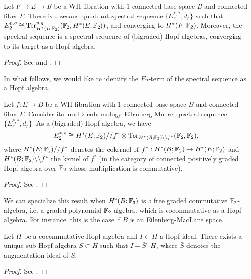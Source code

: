 \begin{thm}
Let $F\to E\to B$ be a WH-fibration with $1$-connected base space $B$ and connected fiber $F$. There is a second quadrant spectral sequence $\{E_r^{*,*},d_r\}$ such that $E_2^{p,q}\cong\operatorname{Tor}_{H^*(B;\mathbb{F}_2)}^{p,q}(\mathbb{F}_2,H^*(E;\mathbb{F}_2))$, and converging to $H^*(F;\mathbb{F}_2)$. Moreover, the spectral sequence is a spectral sequence of (bigraded) Hopf algebras, converging to its target as a Hopf algebra.
\end{thm}

\begin{proof}
See \cite[Theorem 1.1, pp. 59-61]{Sm70} and \cite[Appendix: Generalizations, pp. 779-780]{MS68-I}.
\end{proof}

In what follows, we would like to identify the $E_2$-term of the spectral sequence as a Hopf algebra.

\begin{thm}
Let $f:E\to B$ be a WH-fibration with $1$-connected base space $B$ and connected fiber $F$. Consider its mod-$2$ cohomology Eilenberg-Moore spectral sequence $\{E_r^{*,*},d_r\}$. As a (bigraded) Hopf algebra, we have
$$
E_2^{*,*}\cong H^*(E;\mathbb{F}_2)//f^*\otimes\operatorname{Tor}_{H^*(B;\mathbb{F}_2)\backslash\backslash f^*}(\mathbb{F}_2,\mathbb{F}_2),
$$ where $H^*(E;\mathbb{F}_2)//f^*$ denotes the cokernel of $f^*:H^*(B;\mathbb{F}_2)\to H^*(E;\mathbb{F}_2)$ and $H^*(B;\mathbb{F}_2)\backslash\backslash f^*$ the kernel of $f^*$ (in the category of connected positively graded Hopf algebra over $\mathbb{F}_2$ whose multiplication is commutative).
\end{thm}

\begin{proof}
See \cite[Theorem 2.4, p. 67]{Sm70}.
\end{proof}

We can specialize this result when $H^*(B;\mathbb{F}_2)$ is a free graded commutative $\mathbb{F}_2$-algebra, i.e. a graded polynomial $\mathbb{F}_2$-algebra, which is cocommutative as a Hopf algebra. For instance, this is the case if $B$ is an Eilenberg-MacLane space.

\begin{prop}\label{p:sub-Hopf generator}
Let $H$ be a cocommutative Hopf algebra and $I\subset H$ a Hopf ideal. There exists a unique sub-Hopf algebra $S\subset H$ such that $I=\bar{S}\cdot H$, where $\bar{S}$ denotes the augmentation ideal of $S$.
\end{prop}

\begin{proof}
See \cite[Proposition 1.4, pp. 311-312]{Sm67}.
\end{proof}

